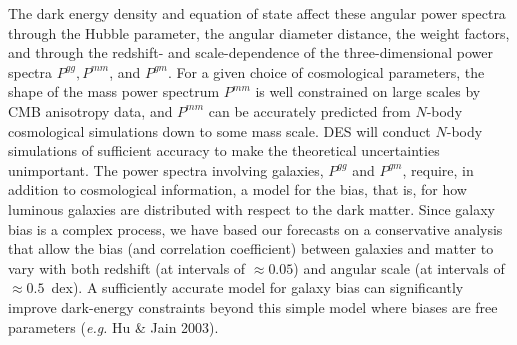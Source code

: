 \documentclass[preprint]{aastex}
\begin{document}
The dark energy density and equation of state affect these angular
power spectra through the Hubble parameter, the angular diameter
distance, the weight factors, and through the redshift- and
scale-dependence of the three-dimensional power spectra $P^{gg},
P^{mm}$, and $P^{gm}$. For a given choice of cosmological
parameters, the shape of the mass power spectrum $P^{mm}$ is well
constrained on large scales by CMB anisotropy data, and
 $P^{mm}$ can be accurately
predicted from $N$-body cosmological simulations down to some mass
scale.  DES will conduct $N$-body simulations of sufficient accuracy
to make the theoretical uncertainties unimportant. 
The power spectra involving galaxies, $P^{gg}$ and
$P^{gm}$, require, in addition to cosmological information, a
model for the bias, that is, for how luminous 
galaxies are distributed with respect to the dark matter. Since
galaxy bias is a complex process, we have based our forecasts on a
conservative analysis that 
allow the bias (and correlation coefficient) between galaxies and
matter to vary with both redshift (at intervals of $\approx 0.05$) and
angular scale (at intervals of $\approx 0.5$~dex).  A sufficiently
accurate model for galaxy bias can significantly improve dark-energy
constraints beyond this simple model where biases are free parameters
({\it e.g.} Hu \& Jain 2003).
\end{document}
